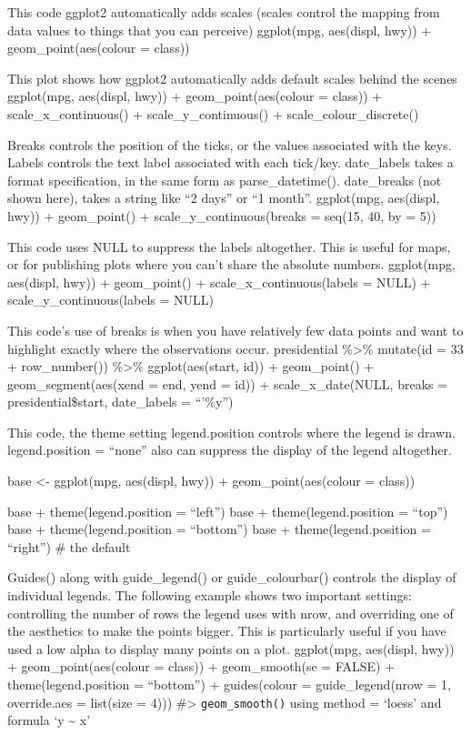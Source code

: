 \documentclass[
]{article}
\begin{document}
This code ggplot2 automatically adds scales (scales control the mapping
from data values to things that you can perceive) ggplot(mpg, aes(displ,
hwy)) + geom\_point(aes(colour = class))

This plot shows how ggplot2 automatically adds default scales behind the
scenes ggplot(mpg, aes(displ, hwy)) + geom\_point(aes(colour = class)) +
scale\_x\_continuous() + scale\_y\_continuous() +
scale\_colour\_discrete()

Breaks controls the position of the ticks, or the values associated with
the keys. Labels controls the text label associated with each tick/key.
date\_labels takes a format specification, in the same form as
parse\_datetime(). date\_breaks (not shown here), takes a string like
``2 days'' or ``1 month''. ggplot(mpg, aes(displ, hwy)) + geom\_point()
+ scale\_y\_continuous(breaks = seq(15, 40, by = 5))

This code uses NULL to suppress the labels altogether. This is useful
for maps, or for publishing plots where you can't share the absolute
numbers. ggplot(mpg, aes(displ, hwy)) + geom\_point() +
scale\_x\_continuous(labels = NULL) + scale\_y\_continuous(labels =
NULL)

This code's use of breaks is when you have relatively few data points
and want to highlight exactly where the observations occur. presidential
\%\textgreater\% mutate(id = 33 + row\_number()) \%\textgreater\%
ggplot(aes(start, id)) + geom\_point() + geom\_segment(aes(xend = end,
yend = id)) + scale\_x\_date(NULL, breaks = presidential\$start,
date\_labels = ``'\%y'')

This code, the theme setting legend.position controls where the legend
is drawn. legend.position = ``none'' also can suppress the display of
the legend altogether.

base \textless- ggplot(mpg, aes(displ, hwy)) + geom\_point(aes(colour =
class))

base + theme(legend.position = ``left'') base + theme(legend.position =
``top'') base + theme(legend.position = ``bottom'') base +
theme(legend.position = ``right'') \# the default

Guides() along with guide\_legend() or guide\_colourbar() controls the
display of individual legends. The following example shows two important
settings: controlling the number of rows the legend uses with nrow, and
overriding one of the aesthetics to make the points bigger. This is
particularly useful if you have used a low alpha to display many points
on a plot. ggplot(mpg, aes(displ, hwy)) + geom\_point(aes(colour =
class)) + geom\_smooth(se = FALSE) + theme(legend.position = ``bottom'')
+ guides(colour = guide\_legend(nrow = 1, override.aes = list(size =
4))) \#\textgreater{} \texttt{geom\_smooth()} using method = `loess' and
formula `y \textasciitilde{} x'
\end{document}
